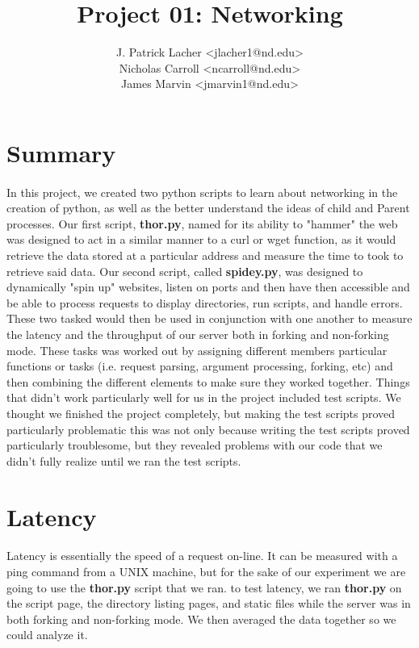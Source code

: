 \documentclass{article}
\title{Project 01: Networking}
\author{J. Patrick Lacher {\textless}jlacher1@nd.edu{\textgreater}
\\Nicholas Carroll {\textless}ncarroll@nd.edu{\textgreater}
\\James Marvin {\textless}jmarvin1@nd.edu{\textgreater}}
\begin{document}
\maketitle


\section{Summary}

\paragraph{}

In this project, we created two python scripts to learn about networking in the creation of python, as well as the better understand the ideas of child and Parent processes.  Our first script, \textbf{thor.py}, named for its ability to  "hammer" the web was designed to act in a similar manner to a curl or wget function, as it would retrieve the data stored at a particular address and measure the time to took to retrieve said data. Our second script, called \textbf{spidey.py}, was designed to dynamically "spin up" websites, listen on ports and then have then accessible and be able to process requests to display directories, run scripts, and handle errors.  These two tasked would then be used in conjunction with one another to measure the latency and the throughput of our server both in forking and non-forking mode.  These tasks was worked out by assigning different members particular functions or tasks (i.e. request parsing, argument processing, forking, etc) and then combining the different elements to make sure they worked together.  Things that didn't work particularly well for us in the project included test scripts.  We thought we finished the project completely, but making the test scripts proved particularly problematic this was not only because writing the test scripts proved particularly troublesome, but they revealed problems with our code that we didn't fully realize until we ran the test scripts.  


\section{Latency}

\paragraph{}

Latency is essentially the speed of a request on-line. It can be measured with a ping command from a UNIX machine, but for the sake of our experiment we are going to use the \textbf{thor.py} script that we ran.  to test latency, we ran \textbf{thor.py} on the script page, the directory listing pages, and static files while the server was in both forking and non-forking mode.  We then averaged the data together so we could analyze it.  
\end{document}
